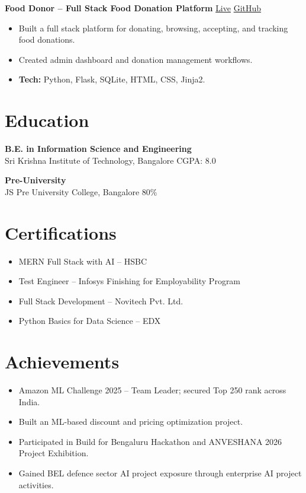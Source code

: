 \documentclass[a4paper,10pt]{article}
\newcommand{\entryspace}{\vspace{5pt}}
\begin{document}
\entryspace
\textbf{Food Donor -- Full Stack Food Donation Platform} \hfill
\href{https://food-donor-o9d5.onrender.com}{Live} \textbar{}
\href{https://github.com/harsha-b-dev/Food-Donor}{GitHub}
\begin{itemize}
    \item Built a full stack platform for donating, browsing, accepting, and tracking food donations.
    \item Created admin dashboard and donation management workflows.
    \item \textbf{Tech:} Python, Flask, SQLite, HTML, CSS, Jinja2.
\end{itemize}

\section*{Education}
\textbf{B.E. in Information Science and Engineering} \\
Sri Krishna Institute of Technology, Bangalore \hfill CGPA: 8.0

\vspace{2pt}
\textbf{Pre-University} \\
JS Pre University College, Bangalore \hfill 80\%

\section*{Certifications}
\begin{itemize}
    \item MERN Full Stack with AI -- HSBC
    \item Test Engineer -- Infosys Finishing for Employability Program
    \item Full Stack Development -- Novitech Pvt. Ltd.
    \item Python Basics for Data Science -- EDX
\end{itemize}

\section*{Achievements}
\begin{itemize}
    \item Amazon ML Challenge 2025 -- Team Leader; secured Top 250 rank across India.
    \item Built an ML-based discount and pricing optimization project.
    \item Participated in Build for Bengaluru Hackathon and ANVESHANA 2026 Project Exhibition.
    \item Gained BEL defence sector AI project exposure through enterprise AI project activities.
\end{itemize}
\end{document}

